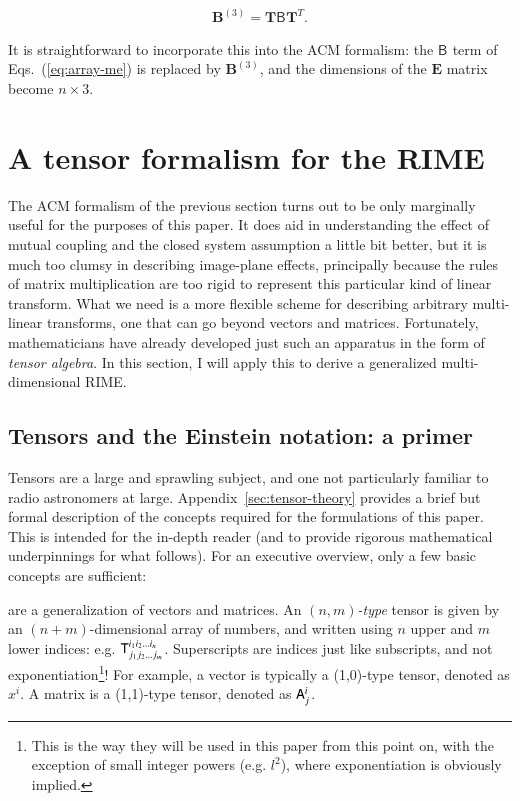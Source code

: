 \documentclass[]{aa}
\newcommand{\coh}[2]{\mathsf{{#1}}_{{#2}}}
\begin{document}
\[
  \mathbf{B}^{(3)} = \mathbf{T} \coh{B}{} \mathbf{T}^T.
\]

It is straightforward to incorporate this into the ACM formalism: the $\coh{B}{}$ term of Eqs.~(\ref{eq:array-me}) 
is replaced by $\mathbf{B}^{(3)}$, and the dimensions of the $\mathbf{E}$ matrix become $n\times3$.

\section{A tensor formalism for the RIME}
\label{sec:tensor}

The ACM formalism of the previous section turns out to be only marginally useful for the purposes of this paper. It does aid in understanding the effect of mutual coupling and the closed system assumption a little bit better, but it is much too clumsy in describing image-plane effects, principally because the rules of matrix multiplication are too rigid to represent this particular kind of linear transform. What we need is a more flexible scheme for describing arbitrary multi-linear transforms, one that can go beyond vectors and matrices. Fortunately, mathematicians have already developed just such an apparatus in the form of \emph{tensor algebra}. In this section, I will apply this to derive a generalized multi-dimensional RIME.

\subsection{Tensors and the Einstein notation: a primer}

Tensors are a large and sprawling subject, and one not particularly familiar to radio astronomers at large. Appendix~\ref{sec:tensor-theory} provides a brief but formal description of the concepts required for the formulations of this paper. This is intended for the in-depth reader (and to provide rigorous mathematical underpinnings for what follows). For an executive overview, only a few basic concepts are sufficient:
  
 are a generalization of vectors and matrices. An \emph{$(n,m)$-type} tensor is given by an $(n+m)$-dimensional array of numbers, and written using $n$ upper and $m$ lower indices: e.g. $\mathsf{T}_{j_{1}j_{2}...j_{m}}^{i_{1}i_{2}...i_{n}}$. Superscripts are indices just like subscripts, and not exponentiation\footnote{This is the way they will be used in this paper from this point on, with the exception of small integer powers (e.g. $l^2$), where exponentiation is obviously implied.}! For example, a vector is typically a (1,0)-type tensor, denoted as $x^i$. A matrix is a (1,1)-type tensor, denoted as $\mathsf{A}^i_j$.
\end{document}
